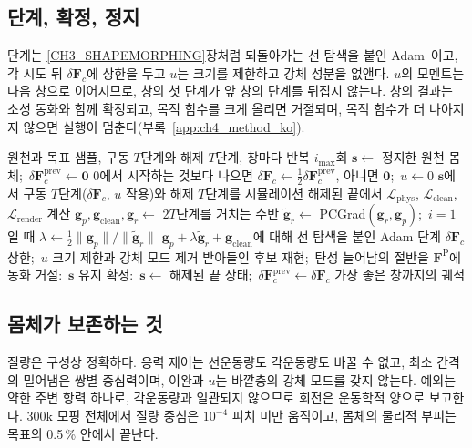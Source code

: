\subsection{단계, 확정, 정지}
단계는 \ref{CH3_SHAPEMORPHING}장처럼 되돌아가는 선 탐색을 붙인 Adam~\citep{kingma2017adammethodstochasticoptimization}이고,
각 시도 뒤 $\delta\mathbf{F}_c$에 상한을 두고 $u$는 크기를 제한하고 강체 성분을 없앤다. $u$의 모멘트는 다음 창으로 이어지므로,
창의 첫 단계가 앞 창의 단계를 뒤집지 않는다. 창의 결과는 소성 동화와 함께 확정되고, 목적 함수를 크게 올리면 거절되며,
목적 함수가 더 나아지지 않으면 실행이 멈춘다(부록~\ref{app:ch4_method_ko}).

\begin{algorithm}[t]
  \caption{안정화 창 모핑}\label{ch4:alg_window_ko}
  \begin{algorithmic}[1]
    \Require 원천과 목표 샘플, 구동 $T$단계와 해제 $T$단계, 창마다 반복 $i_{\max}$회
    \State $\mathbf{s}\gets$ 정지한 원천 몸체;\ $\delta\mathbf{F}^{\mathrm{prev}}_c\gets\mathbf{0}$
      \State 0에서 시작하는 것보다 나으면 $\delta\mathbf{F}_c\gets\tfrac12\delta\mathbf{F}^{\mathrm{prev}}_c$, 아니면 $\mathbf{0}$;\ $u\gets 0$
        \State $\mathbf{s}$에서 구동 $T$단계($\delta\mathbf{F}_c$, $u$ 작용)와 해제 $T$단계를 시뮬레이션
        \State 해제된 끝에서 $\mathcal{L}_{\mathrm{phys}}$, $\mathcal{L}_{\mathrm{clean}}$, $\mathcal{L}_{\mathrm{render}}$ 계산
        \State $\mathbf{g}_p,\mathbf{g}_{\mathrm{clean}},\mathbf{g}_r\gets$ $2T$단계를 거치는 수반
        \State $\tilde{\mathbf{g}}_r\gets$ PCGrad$(\mathbf{g}_r,\mathbf{g}_p)$;\ $i=1$일 때 $\lambda\gets\tfrac12\lVert\mathbf{g}_p\rVert/\lVert\tilde{\mathbf{g}}_r\rVert$
        \State $\mathbf{g}_p+\lambda\tilde{\mathbf{g}}_r+\mathbf{g}_{\mathrm{clean}}$에 대해 선 탐색을 붙인 Adam 단계
        \State $\delta\mathbf{F}_c$ 상한;\ $u$ 크기 제한과 강체 모드 제거
      \EndFor
      \State 받아들인 후보 재현;\ 탄성 늘어남의 절반을 $\mathbf{F}^{\mathrm{P}}$에 동화
        \State 거절:\ $\mathbf{s}$ 유지
      \Else
        \State 확정:\ $\mathbf{s}\gets$ 해제된 끝 상태;\ $\delta\mathbf{F}^{\mathrm{prev}}_c\gets\delta\mathbf{F}_c$
      \EndIf
    \EndWhile
    \State \Return 가장 좋은 창까지의 궤적
  \end{algorithmic}
\end{algorithm}

\subsection{몸체가 보존하는 것}
\label{ch4:sec_conservation_ko}
질량은 구성상 정확하다. 응력 제어는 선운동량도 각운동량도 바꿀 수 없고, 최소 간격의 밀어냄은 쌍별 중심력이며, 이완과 $u$는
바깥층의 강체 모드를 갖지 않는다. 예외는 약한 주변 항력 하나로, 각운동량과 일관되지 않으므로 회전은 운동학적 양으로
보고한다. 300k 모핑 전체에서 질량 중심은 $10^{-4}$ 피치 미만 움직이고, 몸체의 물리적 부피는 목표의 0.5\,\% 안에서 끝난다.

